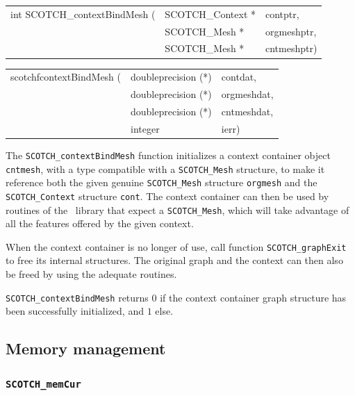 \begin{itemize}
\progsyn

{\tt\begin{tabular}{l@{}ll}
int SCOTCH\_contextBindMesh ( & SCOTCH\_Context * & contptr,    \\
                              & SCOTCH\_Mesh *    & orgmeshptr, \\
                              & SCOTCH\_Mesh *    & cntmeshptr)
\end{tabular}}

{\tt\begin{tabular}{l@{}ll}
scotchfcontextBindMesh ( & doubleprecision (*) & contdat,    \\
                         & doubleprecision (*) & orgmeshdat, \\
                         & doubleprecision (*) & cntmeshdat, \\
                         & integer             & ierr)
\end{tabular}}

\progdes

The \texttt{SCOTCH\_contextBindMesh} function initializes a context
container object \texttt{cnt\lbt mesh}, with a type compatible with a
\texttt{SCOTCH\_\lbt Mesh} structure, to make it reference both the
given genuine \texttt{SCOTCH\_\lbt Mesh} structure
\texttt{org\lbt mesh} and the \texttt{SCOTCH\_\lbt Context} structure
\texttt{cont}. The context container can then be used by routines of
the \libscotch\ library that expect a \texttt{SCOTCH\_\lbt Mesh},
which will take advantage of all the features offered by the given
context.

When the context container is no longer of use, call function
\texttt{SCOTCH\_\lbt graph\lbt Exit} to free its internal
structures. The original graph and the context can then also be freed
by using the adequate routines.

\progret

\texttt{SCOTCH\_contextBindMesh} returns $0$ if the context container
graph structure has been successfully initialized, and $1$ else.
\end{itemize}

\subsection{Memory management}
\label{sec-lib-mem}

\subsubsection{{\tt SCOTCH\_memCur}}


